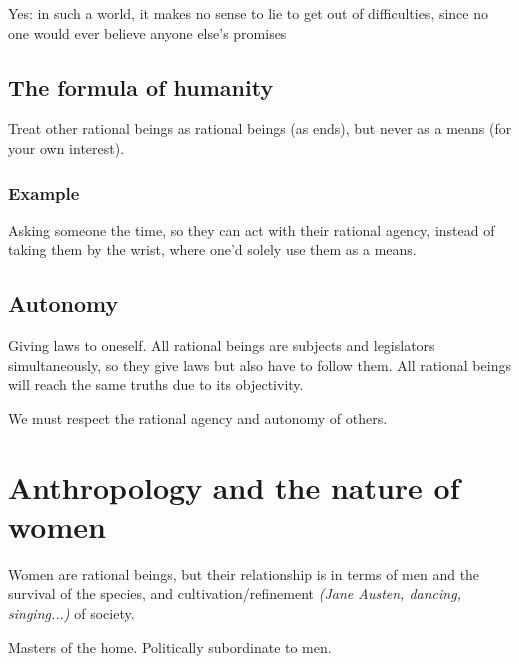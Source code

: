 \documentclass{article}
\begin{document}
Yes: in such a world, it makes no sense to lie to get out of difficulties, since no one would ever believe anyone else's promises

\subsection{The formula of humanity}
Treat other rational beings as rational beings (as ends), but never as a means (for your own interest).

\subsubsection{Example}
Asking someone the time, so they can act with their rational agency, instead of taking them by the wrist, where one'd solely use them as a means.

\subsection{Autonomy}

Giving laws to oneself.
All rational beings are subjects and legislators simultaneously, so they give laws but also have to follow them. All rational beings will reach the same truths due to its objectivity.

We must respect the rational agency and autonomy of others.

\section{Anthropology and the nature of women}

Women are rational beings, but their relationship is in terms of men and the survival of the species, and cultivation/refinement \emph{(Jane Austen, dancing, singing...)} of society.

Masters of the home. Politically subordinate to men.
\end{document}

